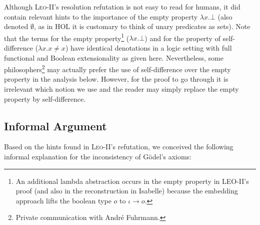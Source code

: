 \documentclass{article}
\newcommand{\imp}{{\rightarrow}}
\begin{document}
Although \textsc{Leo-II}'s resolution refutation is not easy to read
for humans, it did contain relevant hints to the importance of the
empty property $\lambda x. \bot$ (also denoted $\emptyset$, as in HOL it is customary to think of unary predicates as sets).
%
Note that the terms for the empty property\footnote{An additional lambda abstraction occurs in the empty property in LEO-II's proof (and also in the reconstruction in Isabelle) because the embedding approach lifts the boolean type $o$ to $\iota \imp o$.} ($\lambda x. \bot$) and for the property of self-difference ($\lambda x.  x\not=x$) have identical denotations in a logic setting
with full functional and Boolean extensionality as given
here. Nevertheless, some philosophers\footnote{Private communication with Andr\'e Fuhrmann.} may actually prefer the use of
self-difference over the empty property in
the analysis below. However, for the proof to go through it is
irrelevant which notion we use and the reader may simply replace the
empty property by self-difference.



\subsection{Informal Argument} \label{sec:arg1}
Based on the hints found in \textsc{Leo-II}'s refutation, we conceived the following informal explanation for the inconsistency of G\"odel's axioms:
\end{document}

